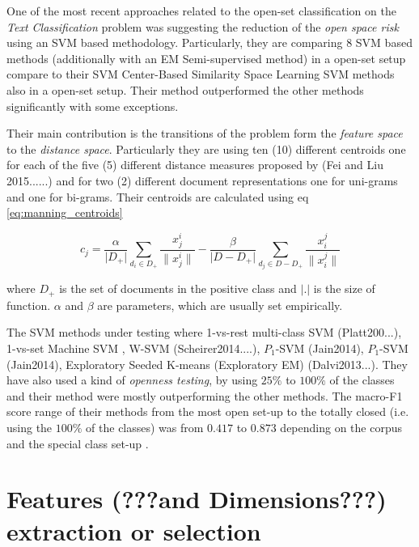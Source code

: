 One of the most recent approaches related to the open-set classification on the \textit{Text Classification} problem was suggesting the reduction of the \textit{open space risk} using an SVM based methodology. Particularly, they are comparing 8 SVM based methods (additionally with an EM Semi-supervised method) in a open-set setup compare to their SVM Center-Based Similarity Space Learning SVM methods also in a open-set setup. Their method outperformed the other methods significantly with some exceptions. 

Their main contribution is the transitions of the problem form the \textit{feature space} to the \textit{distance space}. Particularly they are using ten (10) different centroids one for each of the five (5) different distance measures proposed by (Fei and Liu 2015......) and for two (2) different document representations one for uni-grams and one for bi-grams. Their centroids are calculated using  eq \ref{eq:manning_centroids} 

\begin{equation}\label{eq:manning_centroids}
	c_{j} = \frac{\alpha}{\lvert D_{+} \rvert} \sum_{d_{i} \in D_{+}} \frac{x_{j}^{i}}{\lVert x_{j}^{i} \rVert } - \frac{\beta}{\lvert D - D_{+} \rvert} \sum_{d_{j} \in D - D_{+}} \frac{x_{i}^{j}}{\lVert x_{i}^{j} \rVert}
\end{equation}

where $D_{+}$ is the set of documents in the positive class and $\lvert . \rvert$ is the size of function. $\alpha$ and $\beta$ are parameters, which are usually set empirically.

The SVM methods under testing where 1-vs-rest multi-class SVM (Platt200...), 1-vs-set Machine SVM \cite{scheirer2013toward}, W-SVM (Scheirer2014....), $P_{1}$-SVM (Jain2014), $P_{1}$-SVM (Jain2014), Exploratory Seeded K-means (Exploratory EM) (Dalvi2013...). They have also used a kind of \textit{openness testing}, by using $25\%$ to $100\%$ of the classes and their method were mostly outperforming the other methods. The macro-F1 score range of their methods from the most open set-up to the totally closed (i.e. using the $100\%$ of the classes) was from $0.417$ to $0.873$ depending on the corpus and the special class set-up \parencite{fei2016breaking}.

\section{Features (???and Dimensions???) extraction or selection}\label{chap:relevant_work:sec:features}

